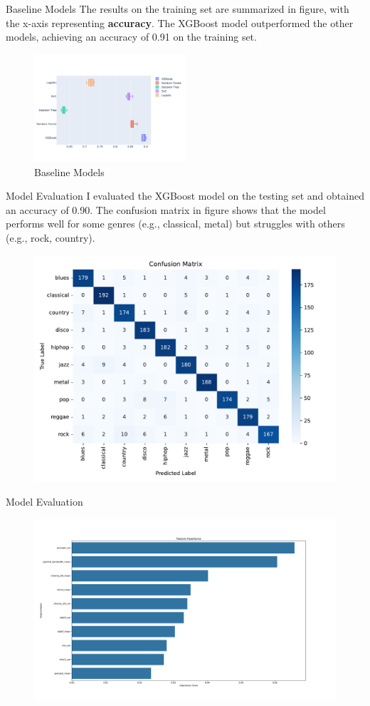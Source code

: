 \documentclass{beamer}
\begin{document}
\begin{frame}{Baseline Models}
  The results on the training set are summarized in figure, with the x-axis representing \textbf{accuracy}. The XGBoost model outperformed the other models, achieving an accuracy of 0.91 on the training set.

  \begin{figure}
    \centering
    \includegraphics[width=0.5\textwidth, trim=0pt 140pt 0pt 140pt, clip]{images/baseline_models.jpg}
    \caption{Baseline Models}
  \end{figure}
\end{frame}

\begin{frame}{Model Evaluation}
  I evaluated the XGBoost model on the testing set and obtained an accuracy of 0.90. The confusion matrix in figure shows that the model performs well for some genres (e.g., classical, metal) but struggles with others (e.g., rock, country).

  \begin{figure}
    \centering
    \includegraphics[height=0.4\textwidth]{images/confusion_matrix.pdf}
  \end{figure}
\end{frame}

\begin{frame}{Model Evaluation}
  \begin{figure}
    \centering
    \includegraphics[height=0.5\textwidth]{images/feature_importance.pdf}
  \end{figure}
\end{frame}
\end{document}
